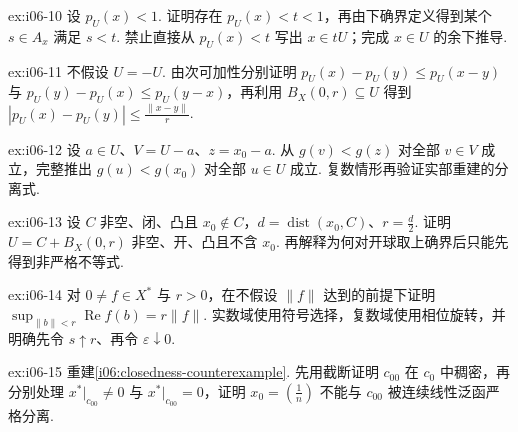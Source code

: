 \begin{FAExercise}[Minkowski集合恢复中的下确界缺口]{ex:i06-10}
设 \(\displaystyle p_U(x)<1\). 证明存在 \(\displaystyle p_U(x)<t<1\)，再由下确界定义得到某个 \(\displaystyle s\in A_x\) 满足 \(\displaystyle s<t\). 禁止直接从 \(\displaystyle p_U(x)<t\) 写出 \(\displaystyle x\in tU\)；完成 \(\displaystyle x\in U\) 的余下推导.
\end{FAExercise}

\begin{FAExercise}[非对称Minkowski连续性]{ex:i06-11}
不假设 \(\displaystyle U=-U\). 由次可加性分别证明 \(\displaystyle p_U(x)-p_U(y)\leqslant p_U(x-y)\) 与 \(\displaystyle p_U(y)-p_U(x)\leqslant p_U(y-x)\)，再利用 \(\displaystyle B_X(0,r)\subseteq U\) 得到 \(\displaystyle |p_U(x)-p_U(y)|\leqslant\frac{\|x-y\|}{r}\).
\end{FAExercise}

\begin{FAExercise}[开凸集分离的平移消去]{ex:i06-12}
设 \(\displaystyle a\in U\)、\(\displaystyle V=U-a\)、\(\displaystyle z=x_0-a\). 从 \(\displaystyle g(v)<g(z)\) 对全部 \(\displaystyle v\in V\) 成立，完整推出 \(\displaystyle g(u)<g(x_0)\) 对全部 \(\displaystyle u\in U\) 成立. 复数情形再验证实部重建的分离式.
\end{FAExercise}

\begin{FAExercise}[闭凸集增厚与定量间隙]{ex:i06-13}
设 \(\displaystyle C\) 非空、闭、凸且 \(\displaystyle x_0\notin C\)，\(\displaystyle d=\operatorname{dist}(x_0,C)\)、\(\displaystyle r=\frac{d}{2}\). 证明 \(\displaystyle U=C+B_X(0,r)\) 非空、开、凸且不含 \(\displaystyle x_0\). 再解释为何对开球取上确界后只能先得到非严格不等式.
\end{FAExercise}

\begin{FAExercise}[开球上的实部上确界]{ex:i06-14}
对 \(\displaystyle0\neq f\in X^*\) 与 \(\displaystyle r>0\)，在不假设 \(\displaystyle \|f\|\) 达到的前提下证明 \(\displaystyle \sup_{\|b\|<r}\operatorname{Re}f(b)=r\|f\|\).
实数域使用符号选择，复数域使用相位旋转，并明确先令 \(\displaystyle s\uparrow r\)、再令 \(\displaystyle \varepsilon\downarrow0\).
\end{FAExercise}

\begin{FAExercise}[闭性必要性]{ex:i06-15}
重建\autoref{i06:closedness-counterexample}. 先用截断证明 \(\displaystyle c_{00}\) 在 \(\displaystyle c_0\) 中稠密，再分别处理 \(\displaystyle x^*|_{c_{00}}\neq0\) 与 \(\displaystyle x^*|_{c_{00}}=0\)，证明 \(\displaystyle x_0=(\frac{1}{n})\) 不能与 \(\displaystyle c_{00}\) 被连续线性泛函严格分离.
\end{FAExercise}

